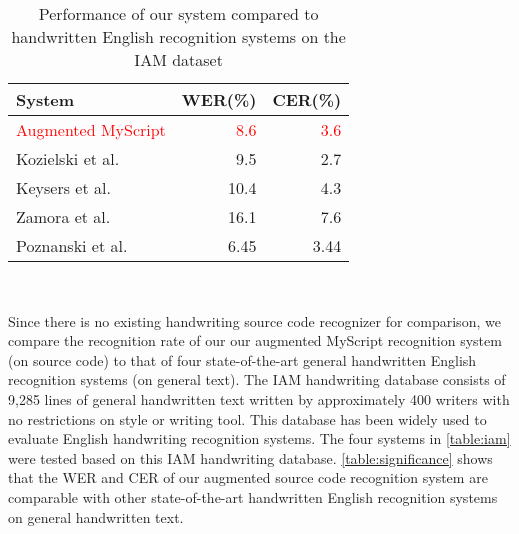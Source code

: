 \documentclass{vgtc}                          %
\begin{document}


\begin{table}
  \centering
  \begin{tabular}{l r r}
    {System}
    & {WER(\%)}
      & {CER(\%)} \\
    \midrule
    \textcolor{red}{Augmented MyScript}  & \textcolor{red}{8.6} & \textcolor{red}{3.6} \\
    Kozielski et al. \cite{doetsch2013improvements} & 9.5 & 2.7 \\
    Keysers et al. \cite{keysers2016multi} & 10.4 &  4.3  \\
    Zamora et al. \cite{zamora2014neural} & 16.1  & 7.6  \\
    Poznanski et al. \cite{poznanski2016cnn} & 6.45 & 3.44 \\
  \end{tabular}
  \caption{Performance of our system compared to handwritten English recognition systems on the IAM dataset}~\label{table:iam}
\end{table}


Since there is no existing handwriting source code recognizer for comparison, we compare the recognition rate of our our augmented MyScript recognition system (on source code) to that of four state-of-the-art general handwritten English recognition systems (on general text). 
The IAM handwriting database \cite{marti2002iam} consists of 9,285 lines of general handwritten text
written by approximately 400 writers with no restrictions on style or writing tool. This database has been widely used to evaluate English handwriting recognition systems. The four systems in \autoref{table:iam} were tested based on this IAM handwriting database. \autoref{table:significance} shows that the WER and CER of our augmented source code recognition system are comparable with other state-of-the-art handwritten English recognition systems on general handwritten text.
\end{document}
